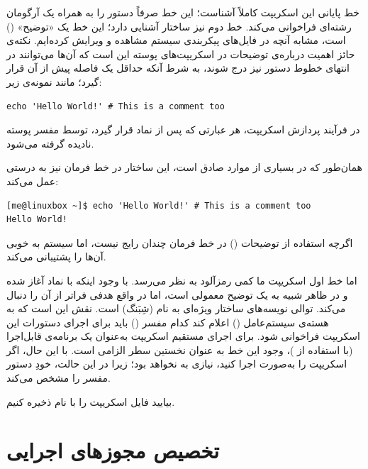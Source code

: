 خط پایانی این اسکریپت کاملاً آشناست؛ این خط صرفاً دستور  را به همراه یک آرگومان رشته‌ای فراخوانی می‌کند. خط دوم نیز ساختار آشنایی دارد؛ این خط یک «توضیح» () است، مشابه آنچه در فایل‌های پیکربندی سیستم مشاهده و ویرایش کرده‌ایم. نکته‌ی حائز اهمیت درباره‌ی توضیحات در اسکریپت‌های پوسته این است که آن‌ها می‌توانند در انتهای خطوط دستور نیز درج شوند، به شرط آنکه حداقل یک فاصله پیش از آن قرار گیرد؛ مانند نمونه‌ی زیر:

\begin{latin}
\begin{lstlisting}
echo 'Hello World!' # This is a comment too
\end{lstlisting}
\end{latin}

در فرآیند پردازش اسکریپت، هر عبارتی که پس از نماد \cmd{\#} قرار گیرد، توسط مفسر پوسته نادیده گرفته می‌شود.

همان‌طور که در بسیاری از موارد صادق است، این ساختار در خط فرمان نیز به درستی عمل می‌کند:

\begin{latin}
\begin{lstlisting}
[me@linuxbox ~]$ echo 'Hello World!' # This is a comment too
Hello World!
\end{lstlisting}
\end{latin}

اگرچه استفاده از توضیحات () در خط فرمان چندان رایج نیست، اما سیستم به خوبی آن‌ها را پشتیبانی می‌کند.

اما خط اول اسکریپت ما کمی رمزآلود به نظر می‌رسد. با وجود اینکه با نماد \cmd{\#} آغاز شده و در ظاهر شبیه به یک توضیح معمولی است، اما در واقع هدفی فراتر از آن را دنبال می‌کند. توالی نویسه‌های \cmd{\#!} ساختار ویژه‌ای به نام  (شِبَنگ) است. نقش  این است که به هسته‌ی سیستم‌عامل () اعلام کند کدام مفسر () باید برای اجرای دستورات این اسکریپت فراخوانی شود. برای اجرای مستقیم اسکریپت به‌عنوان یک برنامه‌ی قابل‌اجرا (با استفاده از )، وجود این خط به عنوان نخستین سطر الزامی است. با این حال، اگر اسکریپت را به‌صورت  اجرا کنید، نیازی به  نخواهد بود؛ زیرا در این حالت، خودِ دستور  مفسر را مشخص می‌کند.

بیایید فایل اسکریپت را با نام  ذخیره کنیم.

\section{تخصیص مجوزهای اجرایی}


